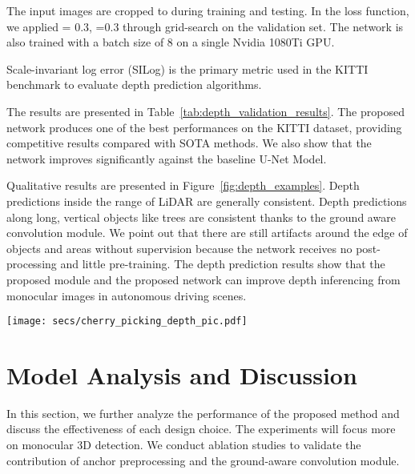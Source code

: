 \documentclass[letterpaper, 10 pt, journal, twoside]{IEEEtran}
\begin{document}
The input images are cropped to  during training and testing.  In the loss function, we applied = 0.3, =0.3 through grid-search on the validation set. The network is also trained with a batch size of 8 on a single Nvidia 1080Ti GPU. 

Scale-invariant log error (SILog) is the primary metric used in the KITTI benchmark to evaluate depth prediction algorithms. 

The results are presented in Table~\ref{tab:depth_validation_results}. The proposed network produces one of the best performances on the KITTI dataset, providing competitive results compared with SOTA methods. We also show that the network improves significantly against the baseline U-Net Model.

Qualitative results are presented in Figure~\ref{fig:depth_examples}. Depth predictions inside the range of LiDAR are generally consistent. Depth predictions along long, vertical objects like trees are consistent thanks to the ground aware convolution module. We point out that there are still artifacts around the edge of objects and areas without supervision because the network receives no post-processing and little pre-training.
The depth prediction results show that the proposed module and the proposed network can improve depth inferencing from monocular images in autonomous driving scenes.


\begin{figure*}
    \centering
    \texttt{[image: secs/cherry\_picking\_depth\_pic.pdf]}
    

    \caption{Qualitative examples of depth prediction from validation sets. The depth maps on the right are rendered with the official color map.
    }

    \label{fig:depth_examples}
\end{figure*}
 \section{Model Analysis and Discussion}
\label{section:Discussion}
In this section, we further analyze the performance of the proposed method and discuss the effectiveness of each design choice. The experiments will focus more on monocular 3D detection.
We conduct ablation studies to validate the contribution of anchor preprocessing and the ground-aware convolution module.
\end{document}

